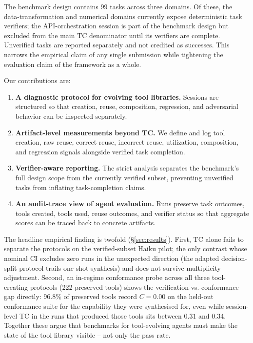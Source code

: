 \documentclass[sigconf,anonymous,natbib=false]{acmart}
\begin{document}
The benchmark design contains 99 tasks across three domains. Of these, the data-transformation and numerical domains currently expose deterministic task verifiers; the API-orchestration session is part of the benchmark design but excluded from the main TC denominator until its verifiers are complete. Unverified tasks are reported separately and not credited as successes. This narrows the empirical claim of any single submission while tightening the evaluation claim of the framework as a whole.

Our contributions are:
\begin{enumerate}[leftmargin=1.2em]
  \item \textbf{A diagnostic protocol for evolving tool libraries.} Sessions are structured so that creation, reuse, composition, regression, and adversarial behavior can be inspected separately.
  \item \textbf{Artifact-level measurements beyond TC.} We define and log tool creation, raw reuse, correct reuse, incorrect reuse, utilization, composition, and regression signals alongside verified task completion.
  \item \textbf{Verifier-aware reporting.} The strict analysis separates the benchmark's full design scope from the currently verified subset, preventing unverified tasks from inflating task-completion claims.
  \item \textbf{An audit-trace view of agent evaluation.} Runs preserve task outcomes, tools created, tools used, reuse outcomes, and verifier status so that aggregate scores can be traced back to concrete artifacts.
\end{enumerate}

The headline empirical finding is twofold (\S\ref{sec:results}). First, TC alone fails to separate the protocols on the verified-subset Haiku pilot; the only contrast whose nominal CI excludes zero runs in the unexpected direction (the adapted decision-split protocol trails one-shot synthesis) and does not survive multiplicity adjustment. Second, an in-regime conformance probe across all three tool-creating protocols (222 preserved tools) shows the verification-vs.-conformance gap directly: $96.8\%$ of preserved tools record $C{=}0.00$ on the held-out conformance suite for the capability they were synthesised for, even while session-level TC in the runs that produced those tools sits between $0.31$ and $0.34$. Together these argue that benchmarks for tool-evolving agents must make the state of the tool library visible -- not only the pass rate.
\end{document}
